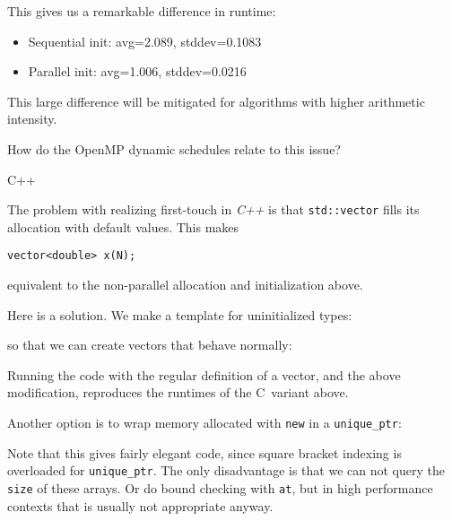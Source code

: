 This gives us a remarkable difference in runtime:
\begin{itemize}
\item
  Sequential init: avg=2.089, stddev=0.1083
\item
  Parallel init: avg=1.006, stddev=0.0216
\end{itemize}
This large difference will be mitigated
for algorithms with higher arithmetic intensity.

\begin{exercise}
  How do the OpenMP dynamic schedules relate to this issue?
\end{exercise}

 {C++}

\lstset{language=C++}

The problem with realizing first-touch in \emph{C++}%
%
is that \lstinline+std::vector+ fills its allocation with default values.
This makes
\begin{lstlisting}
vector<double> x(N);
\end{lstlisting}
equivalent to the non-parallel allocation and initialization above.

Here is a solution.
We make a template for uninitialized types:
%

so that we can create vectors that behave normally:
%

Running the code with the regular definition of a vector,
and the above modification,
reproduces the runtimes of the C~variant above.

Another option is to wrap memory allocated with \lstinline{new}
in a \lstinline+unique_ptr+:
%

Note that this gives fairly elegant code,
since square bracket indexing is overloaded for \lstinline+unique_ptr+.
The only disadvantage is that we can not query the \lstinline{size}
of these arrays. Or do bound checking with \lstinline{at},
but in high performance contexts that is usually not appropriate anyway.

\lstset{language=C}

\begin{comment}
\begin{exercise}
  \label{ex:first-touch}
  Finish the following fragment and run it with first all the cores of
  one socket, then all cores of both sockets. (If you know how to do
  explicit placement, you can also try fewer cores.)
\begin{lstlisting}
  for (int i=0; i<nlocal+2; i++)
    in[i] = 1.;
  for (int i=0; i<nlocal; i++)
    out[i] = 0.;

  for (int step=0; step<nsteps; step++) {
#pragma omp parallel for schedule(static)
    for (int i=0; i<nlocal; i++) {
      out[i] = ( in[i]+in[i+1]+in[i+2] )/3.;
    }
#pragma omp parallel for schedule(static)
    for (int i=0; i<nlocal; i++)
      in[i+1] = out[i];
    in[0] = 0; in[nlocal+1] = 1;
  }
\end{lstlisting}
\end{exercise}
\end{comment}


